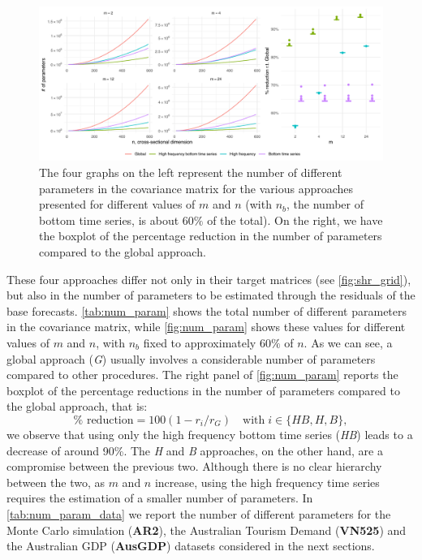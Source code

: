 \documentclass[a4paper,11pt]{article}
\theoremstyle{definition}
\begin{document}
\begin{figure}[!tbp]
	\centering
	\includegraphics[width = \linewidth]{fig/shr_cov/parameters.pdf}
	\caption{The four graphs on the left represent the number of different parameters in the covariance matrix for the various approaches presented for different values of $m$ and $n$ (with $n_b$, the number of bottom time series, is about $60\%$ of the total). On the right, we have the boxplot of the percentage reduction in the number of parameters compared to the global approach.}
	\label{fig:num_param}
\end{figure}

These four approaches differ not only in their target matrices (see \autoref{fig:shr_grid}), but also in the number of parameters to be estimated through the residuals of the base forecasts. \autoref{tab:num_param} shows the total number of different parameters in the covariance matrix, while \autoref{fig:num_param} shows these values for different values of $m$ and $n$, with $n_b$ fixed to approximately $60\%$ of $n$. As we can see, a global approach (\textit{G}) usually involves a considerable number of parameters compared to other procedures. The right panel of \autoref{fig:num_param} reports the boxplot of the percentage reductions in the number of parameters compared to the global approach, that is:
$$
	\% \text{ reduction} = 100(1-r_i/r_G) \quad \mathrm{with} \; i \in \{\textit{HB}, H, B\},
$$
we observe that using only the high frequency bottom time series (\textit{HB}) leads to a decrease of around 90\%. The \textit{H} and \textit{B} approaches, on the other hand, are a compromise between the previous two. Although there is no clear hierarchy between the two, as $m$ and $n$ increase, using the high frequency time series requires the estimation of a smaller number of parameters. In \autoref{tab:num_param_data} we report the number of different parameters for the Monte Carlo simulation (\textbf{AR2}), the Australian Tourism Demand (\textbf{VN525}) and the Australian GDP (\textbf{AusGDP}) datasets considered in the next sections.
\end{document}
